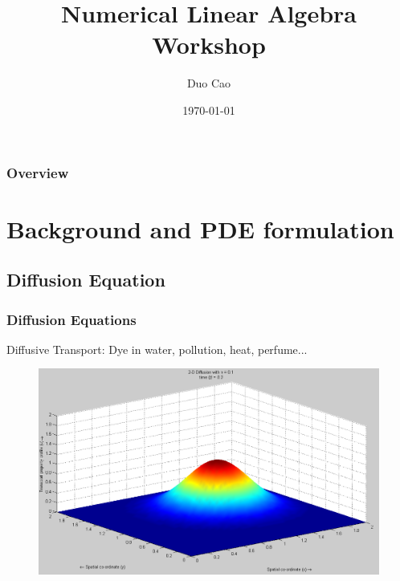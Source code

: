 \documentclass{beamer}
\title[Solving Linear Systems]{Numerical Linear Algebra Workshop} %
\author{Duo Cao} %
\institute[Purdue] %
{
Department of Mathematics, Purdue University \\ %
\medskip
\textit{cao157@purdue.edu} %
}
\date{\today} %
\begin{document}
\begin{frame}
\titlepage %
\end{frame}

\begin{frame}
\frametitle{Overview} %
\tableofcontents %
\end{frame}


\section{Background and PDE formulation} %

\subsection{Diffusion Equation}

\begin{frame}
\frametitle{Diffusion Equations}
Diffusive Transport: Dye in water, pollution, heat, perfume...
\begin{figure}
\includegraphics[width=0.8\linewidth]{heat.png}
\end{figure}

\end{frame}
\end{document}
